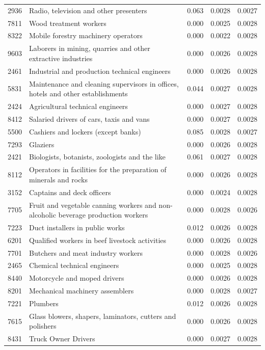 \begin{longtable}{p{}>{\raggedright\arraybackslash}p{}rrr}
2936 & Radio, television and other presenters & 0.063 & 0.0028 & 0.0027 \\
7811 & Wood treatment workers & 0.000 & 0.0025 & 0.0028 \\
8322 & Mobile forestry machinery operators & 0.000 & 0.0022 & 0.0028 \\
9603 & Laborers in mining, quarries and other extractive industries & 0.000 & 0.0026 & 0.0028 \\
2461 & Industrial and production technical engineers & 0.000 & 0.0026 & 0.0028 \\
5831 & Maintenance and cleaning supervisors in offices, hotels and other establishments & 0.044 & 0.0027 & 0.0028 \\
2424 & Agricultural technical engineers & 0.000 & 0.0027 & 0.0028 \\
8412 & Salaried drivers of cars, taxis and vans & 0.000 & 0.0027 & 0.0028 \\
5500 & Cashiers and lockers (except banks) & 0.085 & 0.0028 & 0.0027 \\
7293 & Glaziers & 0.000 & 0.0026 & 0.0028 \\
2421 & Biologists, botanists, zoologists and the like & 0.061 & 0.0027 & 0.0028 \\
8112 & Operators in facilities for the preparation of minerals and rocks & 0.000 & 0.0026 & 0.0028 \\
3152 & Captains and deck officers & 0.000 & 0.0024 & 0.0028 \\
7705 & Fruit and vegetable canning workers and non-alcoholic beverage production workers & 0.000 & 0.0028 & 0.0026 \\
7223 & Duct installers in public works & 0.012 & 0.0026 & 0.0028 \\
6201 & Qualified workers in beef livestock activities & 0.000 & 0.0026 & 0.0028 \\
7701 & Butchers and meat industry workers & 0.000 & 0.0028 & 0.0026 \\
2465 & Chemical technical engineers & 0.000 & 0.0025 & 0.0028 \\
8440 & Motorcycle and moped drivers & 0.000 & 0.0026 & 0.0028 \\
8201 & Mechanical machinery assemblers & 0.000 & 0.0028 & 0.0027 \\
7221 & Plumbers & 0.012 & 0.0026 & 0.0028 \\
7615 & Glass blowers, shapers, laminators, cutters and polishers & 0.000 & 0.0026 & 0.0028 \\
8431 & Truck Owner Drivers & 0.000 & 0.0027 & 0.0028 \\

\end{longtable}
